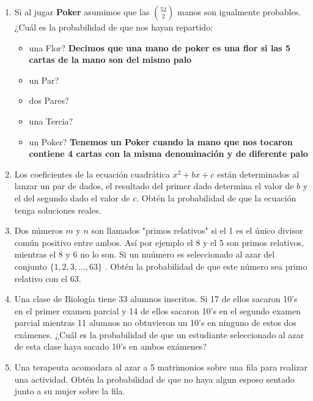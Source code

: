 \documentclass[11pt,letterpaper]{report}
\begin{document}
\begin{enumerate}
\item Si al jugar \textbf{Poker} asumimos que las $\binom{52}{2}$ manos son igualmente probables.
¿Cuál es la probabilidad de que nos hayan repartido:

\begin{itemize}
    \item una Flor? \textbf{Decimos que una mano de poker es una flor si las 5 cartas de la mano son
    del mismo palo} %
    
    
    \item un Par?
    

    \item dos Pares?
    
    \item una Tercia?
    
    \item un Poker? \textbf{Tenemos un Poker cuando la mano que nos tocaron contiene 4 cartas con la
    misma denominación y de diferente palo}
    
\end{itemize}

\item Los coeficientes de la ecuación cuadrática $x^2 + bx + c$ están determinados al lanzar un par
de dados, el resultado del primer dado determina el valor de $b$ y el del segundo dado el valor de
$c$. Obtén la probabilidad de que la ecuación tenga soluciones reales.

\item Dos números $m$ y $n$ son llamados "primos relativos" si el 1 es el único divisor común
positivo entre ambos. Así por ejemplo el 8 y el 5 son primos relativos, mientras el 8 y 6 no lo son.
Si un nuúmero es seleccionado al azar del conjunto $\{ 1, 2, 3,\ldots, 63 \}$ . Obtén la
probabilidad de que este número sea primo relativo con el 63.

\item Una clase de Biología tiene 33 alumnos inscritos. Si 17 de ellos sacaron 10's en el primer
examen parcial y 14 de ellos sacaron 10's en el segundo examen parcial mientras 11 alumnos no
obtuvieron un 10's en ninguno de estos dos exámenes. ¿Cuál es la probabilidad de que un estudiante
seleccionado al azar de esta clase haya sacado 10's en ambos exámenes?

\item Una terapeuta acomodara al azar a 5 matrimonios sobre una fila para realizar una actividad.
Obtén la probabilidad de que no haya algun esposo sentado junto a su mujer sobre la fila.


\end{enumerate}
\end{document}
